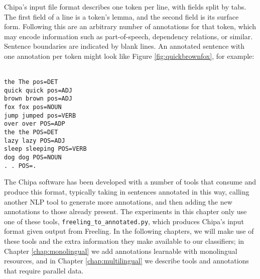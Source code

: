 Chipa's input file format describes one token per line, with fields split by
tabs.  The first field of a line is a token's lemma, and the second field is
its surface form. Following this are an arbitrary number of annotations for
that token, which may encode information such as part-of-speech, dependency
relations, or similar.  Sentence boundaries are indicated by blank lines. An
annotated sentence with one annotation per token might look like Figure
\ref{fig:quickbrownfox}, for example:

\begin{figure*}
\raggedright \texttt{\\
the	The	pos=DET \\
quick	quick	pos=ADJ \\
brown	brown	pos=ADJ \\
fox	fox	pos=NOUN \\
jump	jumped	pos=VERB \\
over	over	POS=ADP \\
the	the	POS=DET \\
lazy	lazy	POS=ADJ \\
sleep sleeping	POS=VERB \\
dog	dog	POS=NOUN \\
.	.	POS=. \\
  }
  \caption{Example annotated sentence.}
  \label{fig:quickbrownfox}
\end{figure*}

The Chipa software has been developed with a number of tools that consume and
produce this format, typically taking in sentences annotated in this way,
calling another NLP tool to generate more annotations, and then adding the new
annotations to those already present. The experiments in this chapter only use
one of these tools, \texttt{freeling\_to\_annotated.py}, which produces Chipa's
input format given output from Freeling.  In the following chapters, we will
make use of these tools and the extra information they make available to our
classifiers; in Chapter \ref{chap:monolingual} we add annotations learnable
with monolingual resources, and in Chapter \ref{chap:multilingual} we describe
tools and annotations that require parallel data.

